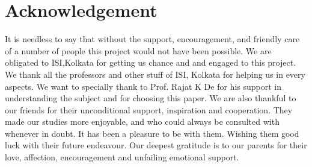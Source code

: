 \documentclass[12 pts]{article}
\begin{document}
\section{Acknowledgement}
It is needless to say that without the support, encouragement, and friendly care of a number of people this project would not have been possible. We are obligated to ISI,Kolkata for getting us chance and and engaged to this project. We thank all the professors and other stuff of ISI, Kolkata for helping us in every aspects. We want to specially thank to Prof. Rajat K De for his support in understanding the subject and for choosing this paper. We are also thankful to our friends for their unconditional support, inspiration and cooperation. They made our studies more enjoyable, and who could always be consulted with whenever in doubt. It has been a pleasure
to be with them. Wishing them good luck with their future endeavour. Our deepest gratitude is to our parents for their love, affection, encouragement and unfailing emotional support.

\clearpage
\end{document}
